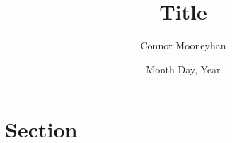 \documentclass[12pt]{article}
\title{Title}
\author{Connor Mooneyhan}
\date{Month Day, Year}
\theoremstyle{definition}
\begin{document}
\maketitle

\section{Section}
\end{document}
